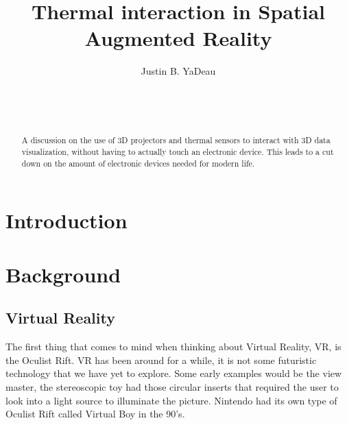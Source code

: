\documentclass{sig-alternate}
\begin{document}

\title{Thermal interaction in Spatial Augmented Reality}


\author{
\alignauthor
Justin B. YaDeau\\
	\\
	\\
	\\
}

\maketitle

\begin{abstract}
A discussion on the use of 3D projectors and thermal sensors to interact with 3D data visualization, without having to actually touch an electronic device. This leads to a cut down on the amount of electronic devices needed for modern life.
\end{abstract}


\section{Introduction}
\label{sec:introduction}

\section{Background}
\label{sec:background} 

\subsection{Virtual Reality}
\label{sec:Virtual Reality}

The first thing that comes to mind when thinking about Virtual Reality, VR, is the Oculist Rift. VR has been around for a while, it is not some futuristic technology that we have yet to explore. Some early examples would be the view master, the stereoscopic toy had those circular inserts that required the user to look into a light source to illuminate the picture. Nintendo had its own type of Oculist Rift called Virtual Boy in the 90's.     
\end{document}
